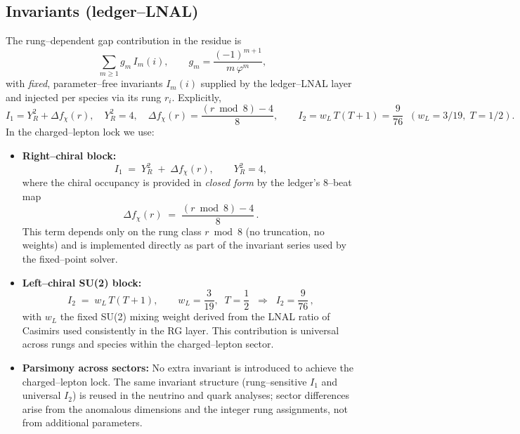 \documentclass[11pt]{article}
\begin{document}
\subsection{Invariants (ledger--LNAL)}
The rung--dependent gap contribution in the residue is
\[
\sum_{m\ge1} g_m\,I_m(i),\qquad g_m=\frac{(-1)^{m+1}}{m\,\varphi^m},
\]
with \emph{fixed}, parameter--free invariants $I_m(i)$ supplied by the ledger--LNAL layer and injected per species via its rung $r_i$. Explicitly,
\begin{equation}\label{eq:I1I2}
I_1 = Y_R^2 + \Delta f_\chi(r),\quad Y_R^2=4,\quad \Delta f_\chi(r)=\frac{(r\bmod 8)-4}{8},\qquad
I_2 = w_L\,T(T{+}1)=\frac{9}{76}\;\;(w_L=3/19,\;T=1/2).
\end{equation}
In the charged--lepton lock we use:
\begin{itemize}
  \item \textbf{Right--chiral block:}
  \[
  I_1 \;=\; Y_R^2 \;+\; \Delta f_\chi(r),\qquad Y_R^2=4,
  \]
  where the chiral occupancy is provided in \emph{closed form} by the ledger’s 8--beat map
  \[
  \Delta f_\chi(r)\;=\;\frac{(r \bmod 8)-4}{8}\,.
  \]
  This term depends only on the rung class $r\bmod 8$ (no truncation, no weights) and is implemented directly as part of the invariant series used by the fixed--point solver.
  \item \textbf{Left--chiral SU(2) block:}
  \[
  I_2 \;=\; w_L\,T(T{+}1),\qquad w_L=\frac{3}{19},\;\;T=\frac{1}{2}
  \;\;\Rightarrow\;\; I_2=\frac{9}{76}\,,
  \]
  with $w_L$ the fixed SU(2) mixing weight derived from the LNAL ratio of Casimirs used consistently in the RG layer. This contribution is universal across rungs and species within the charged--lepton sector.
  \item \textbf{Parsimony across sectors:} No extra invariant is introduced to achieve the charged--lepton lock. The same invariant structure (rung--sensitive $I_1$ and universal $I_2$) is reused in the neutrino and quark analyses; sector differences arise from the anomalous dimensions and the integer rung assignments, not from additional parameters.
\end{itemize}
\end{document}
